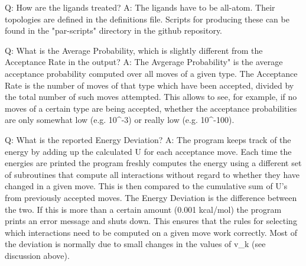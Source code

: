 \documentclass{article}      %
\begin{document}
Q:  How are the ligands treated?
A:  The ligands have to be all-atom. Their topologies are defined in the definitions file. Scripts for producing these can be found in the "par-scripts" directory in the github repository.

Q:  What is the Average Probability, which is slightly different from the Acceptance Rate in the output?
A:  The Avgerage Probability" is the average acceptance probability computed over all moves of a given type.  The Acceptance Rate is the number of moves of that type which have been accepted, divided by the total number of such moves attempted.  This allows to see, for example, if no moves of a certain type are being accepted, whether the acceptance probabilities are only somewhat low (e.g. 10^{-3}) or really low (e.g. 10^{-100}).

Q:  What is the reported Energy Deviation?
A:  The program keeps track of the energy by adding up the calculated \Delta U  for each acceptance move.  Each time the energies are printed the program freshly computes the energy using a different set of subroutines that compute all interactions without regard to whether they have changed in a given move.  This is then compared to the cumulative sum of \Delta U's from previously accepted moves.  The Energy Deviation is the difference between the two. If this is more than a certain amount (0.001 kcal/mol) the program prints an error message and shuts down. This ensures that the rules for selecting which interactions need to be computed on a given move work correctly. Most of the deviation is normally due to small changes in the values of v_{k} (see discussion above).
\end{document}
